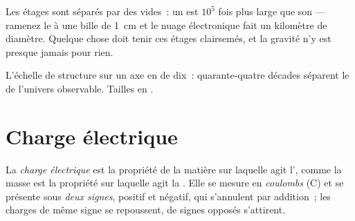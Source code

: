 \begin{remark}\label{rem:g11:fundamental-interactions:empty}
Les étages sont séparés par des vides~: un
 est $10^{5}$ fois plus large que son
 --- ramenez le
 à une bille de \qty{1}{cm} et le
nuage électronique fait un kilomètre de diamètre. Quelque chose doit
tenir ces étages clairsemés, et la gravité n'y est presque jamais pour
rien.
\end{remark}

\begin{omfigure}

{\small L'échelle de structure sur un axe en  de dix~:
quarante-quatre décades séparent le
 de l'univers observable. Tailles en
.}
\end{omfigure}

\section{Charge électrique}

\begin{definition}\label{def:g11:fundamental-interactions:charge}
La \emph{charge électrique} est la propriété de
la matière sur laquelle agit l', comme la masse est la propriété sur laquelle agit
la . Elle se mesure en
\emph{coulombs} (\unit{C}) et se présente sous
\emph{deux signes}, positif et négatif, qui s'annulent par addition~;
les charges de même signe se repoussent, de signes opposés
s'attirent.
\end{definition}

